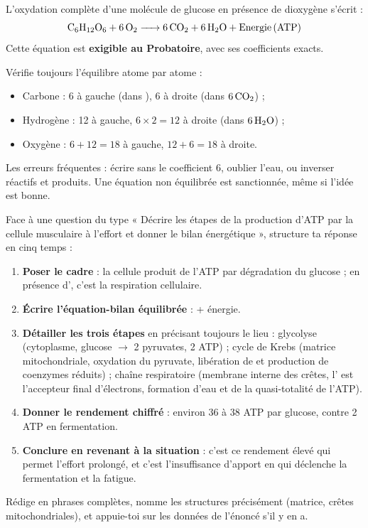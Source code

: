 \documentclass[11pt]{article}
\begin{document}
\begin{propriete}
L'oxydation complète d'une molécule de glucose en présence de dioxygène s'écrit :
\[ \ce{C6H12O6 + 6O2 -> 6CO2 + 6H2O + Energie (ATP)} \]
Cette équation est \textbf{exigible au Probatoire}, avec ses coefficients exacts.
\end{propriete}

\begin{attention}
Vérifie toujours l'équilibre atome par atome :
\begin{itemize}
\item Carbone : 6 à gauche (dans ), 6 à droite (dans $6\,\ce{CO2}$) ;
\item Hydrogène : 12 à gauche, $6 \times 2 = 12$ à droite (dans $6\,\ce{H2O}$) ;
\item Oxygène : $6 + 12 = 18$ à gauche, $12 + 6 = 18$ à droite.
\end{itemize}
Les erreurs fréquentes : écrire  sans le coefficient 6, oublier l'eau, ou inverser réactifs et produits. Une équation non équilibrée est sanctionnée, même si l'idée est bonne.
\end{attention}

\begin{methode}
Face à une question du type « Décrire les étapes de la production d'ATP par la cellule musculaire à l'effort et donner le bilan énergétique », structure ta réponse en cinq temps :
\begin{enumerate}
\item \textbf{Poser le cadre} : la cellule produit de l'ATP par dégradation du glucose ; en présence d', c'est la respiration cellulaire.
\item \textbf{Écrire l'équation-bilan équilibrée} :  + énergie.
\item \textbf{Détailler les trois étapes} en précisant toujours le lieu : glycolyse (cytoplasme, glucose $\to$ 2 pyruvates, 2 ATP) ; cycle de Krebs (matrice mitochondriale, oxydation du pyruvate, libération de  et production de coenzymes réduits) ; chaîne respiratoire (membrane interne des crêtes, l' est l'accepteur final d'électrons, formation d'eau et de la quasi-totalité de l'ATP).
\item \textbf{Donner le rendement chiffré} : environ 36 à 38 ATP par glucose, contre 2 ATP en fermentation.
\item \textbf{Conclure en revenant à la situation} : c'est ce rendement élevé qui permet l'effort prolongé, et c'est l'insuffisance d'apport en  qui déclenche la fermentation et la fatigue.
\end{enumerate}
Rédige en phrases complètes, nomme les structures précisément (matrice, crêtes mitochondriales), et appuie-toi sur les données de l'énoncé s'il y en a.
\end{methode}
\end{document}
